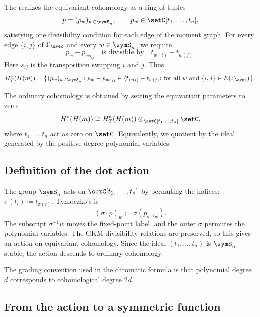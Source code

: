 The \label{gkmDescription} realizes the equivariant
cohomology as a ring of tuples
\[
p=(p_w)_{w\in\symS_n},
\qquad
p_w\in \setC[t_1,\dotsc,t_n],
\]
satisfying one divisibility condition for each edge of the moment graph.
For every edge $\{i,j\}$ of $\Gamma_\avec$ and every $w\in\symS_n$, we require
\[
p_w-p_{w s_{ij}}
\quad\text{is divisible by}\quad
t_{w(i)}-t_{w(j)}.
\]
Here $s_{ij}$ is the transposition swapping $i$ and $j$.
Thus
\[
H_T^\ast(H(m))
=
\left\{
(p_w)_{w\in\symS_n}
:
p_w-p_{w s_{ij}}\in \langle t_{w(i)}-t_{w(j)} \rangle
\text{ for all } w \text{ and } \{i,j\}\in E(\Gamma_\avec)
\right\}.
\]

The ordinary cohomology is obtained by setting the equivariant parameters to
zero:
\[
H^\ast(H(m))
\cong
H_T^\ast(H(m))
\otimes_{\setC[t_1,\dotsc,t_n]}\setC,
\]
where $t_1,\dotsc,t_n$ act as zero on $\setC$.
Equivalently, we quotient by the ideal generated by the positive-degree
polynomial variables.


\subsection[dotActionDefinition]{Definition of the dot action}

The group $\symS_n$ acts on $\setC[t_1,\dotsc,t_n]$ by permuting the indices:
\(\sigma(t_i)\coloneqq t_{\sigma(i)}\).
Tymoczko's 
\label{dotActionOnGKMTuple} is
\[
(\sigma\cdot p)_w
\coloneqq
\sigma\left(p_{\sigma^{-1}w}\right).
\]
The subscript $\sigma^{-1}w$ moves the fixed-point label, and the outer
$\sigma$ permutes the polynomial variables.  The GKM divisibility relations are
preserved, so this gives an action on equivariant cohomology.  Since the ideal
$(t_1,\dotsc,t_n)$ is $\symS_n$-stable, the action descends to ordinary
cohomology.

The grading convention used in the chromatic formula is that polynomial degree
$d$ corresponds to cohomological degree $2d$.


\subsection[dotActionFrobeniusPipeline]{From the action to a symmetric function}

